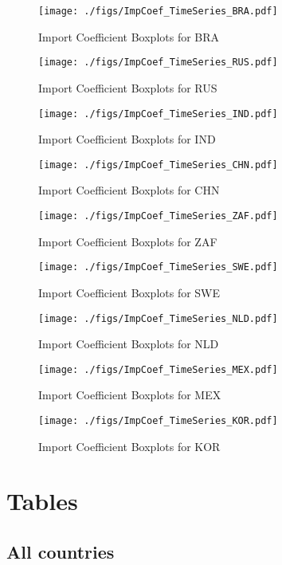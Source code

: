 \documentclass[11pt]{article}
\begin{document}
\begin{figure}[t]
\centering
\texttt{[image: ./figs/ImpCoef\_TimeSeries\_BRA.pdf]}
\caption{Import Coefficient Boxplots for BRA}
\end{figure}

\begin{figure}[t]
\centering
\texttt{[image: ./figs/ImpCoef\_TimeSeries\_RUS.pdf]}
\caption{Import Coefficient Boxplots for RUS}
\end{figure}

\begin{figure}[t]
\centering
\texttt{[image: ./figs/ImpCoef\_TimeSeries\_IND.pdf]}
\caption{Import Coefficient Boxplots for IND}
\end{figure}

\begin{figure}[t]
\centering
\texttt{[image: ./figs/ImpCoef\_TimeSeries\_CHN.pdf]}
\caption{Import Coefficient Boxplots for CHN}
\end{figure}

\begin{figure}[t]
\centering
\texttt{[image: ./figs/ImpCoef\_TimeSeries\_ZAF.pdf]}
\caption{Import Coefficient Boxplots for ZAF}
\end{figure}

\begin{figure}[t]
\centering
\texttt{[image: ./figs/ImpCoef\_TimeSeries\_SWE.pdf]}
\caption{Import Coefficient Boxplots for SWE}
\end{figure}

\begin{figure}[t]
\centering
\texttt{[image: ./figs/ImpCoef\_TimeSeries\_NLD.pdf]}
\caption{Import Coefficient Boxplots for NLD}
\end{figure}

\begin{figure}[t]
\centering
\texttt{[image: ./figs/ImpCoef\_TimeSeries\_MEX.pdf]}
\caption{Import Coefficient Boxplots for MEX}
\end{figure}

\begin{figure}[t]
\centering
\texttt{[image: ./figs/ImpCoef\_TimeSeries\_KOR.pdf]}
\caption{Import Coefficient Boxplots for KOR}
\end{figure}
\section{Tables}
\label{sec:orgb004817}

\subsection{All countries}
\label{sec:org2e856a7}


\end{document}
